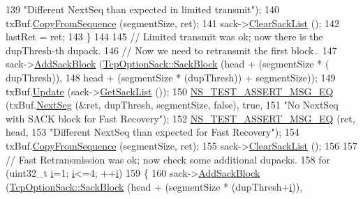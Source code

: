 \begin{DoxyCode}
139                              \textcolor{stringliteral}{"Different NextSeq than expected in limited transmit"});
140       txBuf.\hyperlink{classns3_1_1TcpTxBuffer_a5eb9c889cfad2cd11a5ccf996c506fd3}{CopyFromSequence} (segmentSize, ret);
141       sack->\hyperlink{classns3_1_1TcpOptionSack_ab5f3634e6e86fa9df061596696d130c5}{ClearSackList} ();
142       lastRet = ret;
143     \}
144 
145   \textcolor{comment}{// Limited transmit was ok; now there is the dupThresh-th dupack.}
146   \textcolor{comment}{// Now we need to retransmit the first block..}
147   sack->\hyperlink{classns3_1_1TcpOptionSack_ab7fe631445815bbb5f5bd2e7d6fd2662}{AddSackBlock} (\hyperlink{classns3_1_1TcpOptionSack_a9e1d07d8729fd3ac5ead7305794675c3}{TcpOptionSack::SackBlock} (head + (segmentSize * (
      dupThresh)),
148                                                 head + (segmentSize * (dupThresh)) + segmentSize));
149   txBuf.\hyperlink{classns3_1_1TcpTxBuffer_abed2d31821b2d946068c517195f5cc61}{Update} (sack->\hyperlink{classns3_1_1TcpOptionSack_a08840a554682aeb3aadbccfbb1f6b6fa}{GetSackList} ());
150   \hyperlink{group__testing_ga2a9d78cffb3db8e867c35fff0b698cf5}{NS\_TEST\_ASSERT\_MSG\_EQ} (txBuf.\hyperlink{classns3_1_1TcpTxBuffer_ad08eadd0ba92849a4c4a6920b72acb69}{NextSeg} (&ret, dupThresh, segmentSize, \textcolor{keyword}{false}), \textcolor{keyword}{
      true},
151                          \textcolor{stringliteral}{"No NextSeq with SACK block for Fast Recovery"});
152   \hyperlink{group__testing_ga2a9d78cffb3db8e867c35fff0b698cf5}{NS\_TEST\_ASSERT\_MSG\_EQ} (ret, head,
153                          \textcolor{stringliteral}{"Different NextSeq than expected for Fast Recovery"});
154   txBuf.\hyperlink{classns3_1_1TcpTxBuffer_a5eb9c889cfad2cd11a5ccf996c506fd3}{CopyFromSequence} (segmentSize, ret);
155   sack->\hyperlink{classns3_1_1TcpOptionSack_ab5f3634e6e86fa9df061596696d130c5}{ClearSackList} ();
156 
157   \textcolor{comment}{// Fast Retransmission was ok; now check some additional dupacks.}
158   \textcolor{keywordflow}{for} (uint32\_t \hyperlink{bernuolliDistribution_8m_a6f6ccfcf58b31cb6412107d9d5281426}{i}=1; \hyperlink{bernuolliDistribution_8m_a6f6ccfcf58b31cb6412107d9d5281426}{i}<=4; ++\hyperlink{bernuolliDistribution_8m_a6f6ccfcf58b31cb6412107d9d5281426}{i})
159     \{
160       sack->\hyperlink{classns3_1_1TcpOptionSack_ab7fe631445815bbb5f5bd2e7d6fd2662}{AddSackBlock} (\hyperlink{classns3_1_1TcpOptionSack_a9e1d07d8729fd3ac5ead7305794675c3}{TcpOptionSack::SackBlock} (head + (segmentSize
       * (dupThresh+\hyperlink{bernuolliDistribution_8m_a6f6ccfcf58b31cb6412107d9d5281426}{i})),

\end{DoxyCode}
